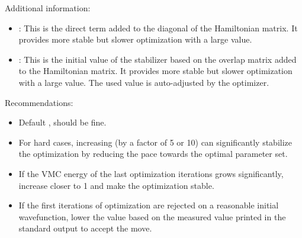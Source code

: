 Additional information:
\begin{itemize}
\item {}: This is the direct term added to the diagonal of the Hamiltonian matrix.
                         It provides more stable but slower optimization with a large value.
\item {}: This is the initial value of the stabilizer based on the overlap matrix added to the Hamiltonian matrix.
                         It provides more stable but slower optimization with a large value. The used value is auto-adjusted by the optimizer.
\end{itemize}


Recommendations:
\begin{itemize}
  \item Default ,  should be fine.
  \item For hard cases, increasing  (by a factor of 5 or 10) can significantly stabilize the optimization by reducing the pace towards the optimal parameter set.
  \item If the VMC energy of the last optimization iterations grows significantly, increase  closer to 1 and make the optimization stable.
  \item If the first iterations of optimization are rejected on a reasonable initial wavefunction, 
        lower the  value based on the measured value printed in the standard output to accept the move.
\end{itemize}

